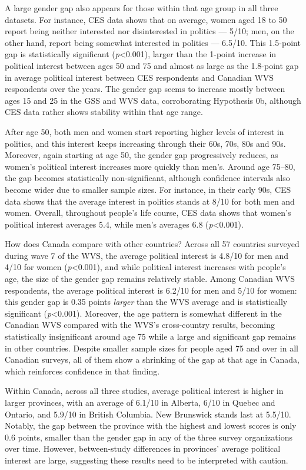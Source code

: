 \documentclass[
  letterpaper,
  DIV=11,
  numbers=noendperiod]{scrreprt}
\begin{document}
A large gender gap also appears for those within that age group in all
three datasets. For instance, CES data shows that on average, women aged
18 to 50 report being neither interested nor disinterested in politics
--- 5/10; men, on the other hand, report being somewhat interested in
politics --- 6.5/10. This 1.5-point gap is statistically significant
(\emph{p}\textless0.001), larger than the 1-point increase in political
interest between ages 50 and 75 and almost as large as the 1.8-point gap
in average political interest between CES respondents and Canadian WVS
respondents over the years. The gender gap seems to increase mostly
between ages 15 and 25 in the GSS and WVS data, corroborating Hypothesis
0b, although CES data rather shows stability within that age range.

After age 50, both men and women start reporting higher levels of
interest in politics, and this interest keeps increasing through their
60s, 70s, 80s and 90s. Moreover, again starting at age 50, the gender
gap progressively reduces, as women's political interest increases more
quickly than men's. Around age 75--80, the gap becomes statistically
non-significant, although confidence intervals also become wider due to
smaller sample sizes. For instance, in their early 90s, CES data shows
that the average interest in politics stands at 8/10 for both men and
women. Overall, throughout people's life course, CES data shows that
women's political interest averages 5.4, while men's averages 6.8
(\emph{p}\textless0.001).

How does Canada compare with other countries? Across all 57 countries
surveyed during wave 7 of the WVS, the average political interest is
4.8/10 for men and 4/10 for women (\emph{p}\textless0.001), and while
political interest increases with people's age, the size of the gender
gap remains relatively stable. Among Canadian WVS respondents, the
average political interest is 6.2/10 for men and 5/10 for women: this
gender gap is 0.35 points \emph{larger} than the WVS average and is
statistically significant (\emph{p}\textless0.001). Moreover, the age
pattern is somewhat different in the Canadian WVS compared with the
WVS's cross-country results, becoming statistically insignificant around
age 75 while a large and significant gap remains in other countries.
Despite smaller sample sizes for people aged 75 and over in all Canadian
surveys, all of them show a shrinking of the gap at that age in Canada,
which reinforces confidence in that finding.

Within Canada, across all three studies, average political interest is
higher in larger provinces, with an average of 6.1/10 in Alberta, 6/10
in Quebec and Ontario, and 5.9/10 in British Columbia. New Brunswick
stands last at 5.5/10. Notably, the gap between the province with the
highest and lowest scores is only 0.6 points, smaller than the gender
gap in any of the three survey organizations over time. However,
between-study differences in provinces' average political interest are
large, suggesting these results need to be interpreted with caution.
\end{document}

